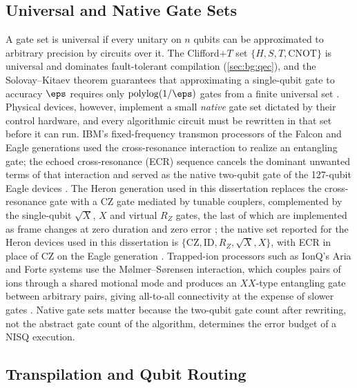 \subsection{Universal and Native Gate Sets}

A gate set is universal if every unitary on $n$ qubits can be approximated to arbitrary precision by circuits over it. The Clifford$+T$ set $\{H,S,T,\mathrm{CNOT}\}$ is universal and dominates fault-tolerant compilation (\cref{sec:bg:qec}), and the Solovay--Kitaev theorem guarantees that approximating a single-qubit gate to accuracy $\eps$ requires only $\mathrm{polylog}(1/\eps)$ gates from a finite universal set \cite{nielsen2010qcqi}. Physical devices, however, implement a small \emph{native} gate set dictated by their control hardware, and every algorithmic circuit must be rewritten in that set before it can run. IBM's fixed-frequency transmon processors of the Falcon and Eagle generations used the cross-resonance interaction to realize an entangling gate; the echoed cross-resonance (ECR) sequence cancels the dominant unwanted terms of that interaction and served as the native two-qubit gate of the 127-qubit Eagle devices \cite{sheldon2016echoedcr,bravyi2022futuresc}. The Heron generation used in this dissertation replaces the cross-resonance gate with a CZ gate mediated by tunable couplers, complemented by the single-qubit $\sqrt{X}$, $X$ and virtual $R_Z$ gates, the last of which are implemented as frame changes at zero duration and zero error \cite{mckay2017virtualz}; the native set reported for the Heron devices used in this dissertation is $\{\mathrm{CZ},\mathrm{ID},R_Z,\sqrt{X},X\}$, with ECR in place of CZ on the Eagle generation \cite{guo2026rubriq}. Trapped-ion processors such as IonQ's Aria and Forte systems use the M{\o}lmer--S{\o}rensen interaction, which couples pairs of ions through a shared motional mode and produces an $XX$-type entangling gate between arbitrary pairs, giving all-to-all connectivity at the expense of slower gates \cite{sorensen1999ms}. Native gate sets matter because the two-qubit gate count after rewriting, not the abstract gate count of the algorithm, determines the error budget of a NISQ execution.

\subsection{Transpilation and Qubit Routing}


